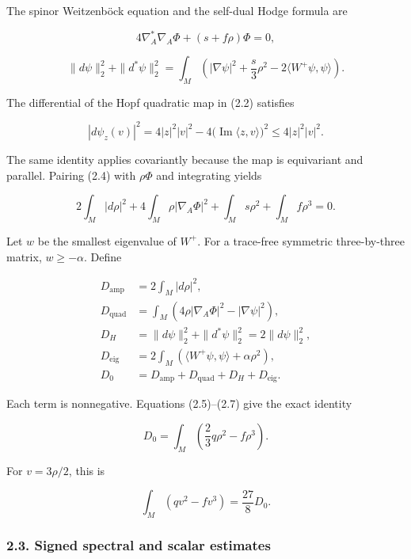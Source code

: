 \documentclass[
  11pt,
]{article}
\begin{document}
The spinor Weitzenböck equation and the self-dual Hodge formula are

\[
 4\nabla_A^*\nabla_A\Phi+(s+f\rho)\Phi=0,                \tag{2.4}
\]

\[
 \|d\psi\|_2^2+\|d^*\psi\|_2^2
   =\int_M\left(|\nabla\psi|^2+\frac{s}{3}\rho^2
                                  -2\langle W^+\psi,\psi\rangle\right).
 \tag{2.5}
\]

The differential of the Hopf quadratic map in (2.2) satisfies

\[
 |d\psi_z(v)|^2
       =4|z|^2|v|^2-4\bigl(\operatorname{Im}\langle z,v\rangle\bigr)^2
       \le4|z|^2|v|^2.                                   \tag{2.6}
\]

The same identity applies covariantly because the map is equivariant and
parallel. Pairing (2.4) with \(\rho\Phi\) and integrating yields

\[
 2\int_M|d\rho|^2+4\int_M\rho|\nabla_A\Phi|^2
                  +\int_Ms\rho^2+\int_M f\rho^3=0.       \tag{2.7}
\]

Let \(w\) be the smallest eigenvalue of \(W^+\). For a trace-free
symmetric three-by-three matrix, \(w\ge-\alpha\). Define

\[
 \begin{split}
 D_{\mathrm{amp}}&=2\int_M|d\rho|^2,\\
 D_{\mathrm{quad}}&=\int_M(4\rho|\nabla_A\Phi|^2-|\nabla\psi|^2),\\
 D_H&=\|d\psi\|_2^2+\|d^*\psi\|_2^2=2\|d\psi\|_2^2,\\
 D_{\mathrm{eig}}&=2\int_M
           (\langle W^+\psi,\psi\rangle+\alpha\rho^2),\\
 D_0&=D_{\mathrm{amp}}+D_{\mathrm{quad}}+D_H+D_{\mathrm{eig}}.
 \end{split}                                              \tag{2.8}
\]

Each term is nonnegative. Equations (2.5)--(2.7) give the exact identity

\[
 D_0=\int_M\left(\frac23q\rho^2-f\rho^3\right).
 \tag{2.9}
\]

For \(v=3\rho/2\), this is

\[
                  \int_M(qv^2-fv^3)=\frac{27}{8}D_0.
 \tag{2.10}
\]

\hypertarget{signed-spectral-and-scalar-estimates}{%
\subsubsection{2.3. Signed spectral and scalar
estimates}\label{signed-spectral-and-scalar-estimates}}
\end{document}
